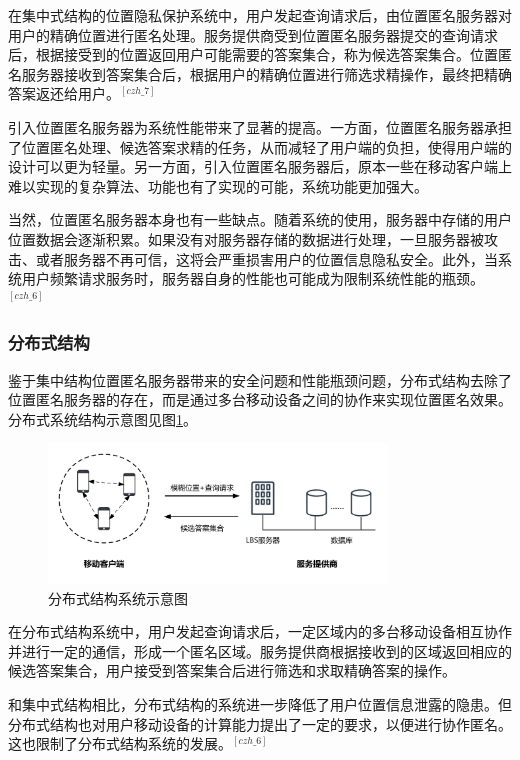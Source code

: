 \documentclass[zihao=-4]{ctexart}
\begin{document}
在集中式结构的位置隐私保护系统中，用户发起查询请求后，由位置匿名服务器对用户的精确位置进行匿名处理。服务提供商受到位置匿名服务器提交的查询请求后，根据接受到的位置返回用户可能需要的答案集合，称为候选答案集合。位置匿名服务器接收到答案集合后，根据用户的精确位置进行筛选求精操作，最终把精确答案返还给用户。$^{[czh\_7]}$
\par
引入位置匿名服务器为系统性能带来了显著的提高。一方面，位置匿名服务器承担了位置匿名处理、候选答案求精的任务，从而减轻了用户端的负担，使得用户端的设计可以更为轻量。另一方面，引入位置匿名服务器后，原本一些在移动客户端上难以实现的复杂算法、功能也有了实现的可能，系统功能更加强大。
\par
当然，位置匿名服务器本身也有一些缺点。随着系统的使用，服务器中存储的用户位置数据会逐渐积累。如果没有对服务器存储的数据进行处理，一旦服务器被攻击、或者服务器不再可信，这将会严重损害用户的位置信息隐私安全。此外，当系统用户频繁请求服务时，服务器自身的性能也可能成为限制系统性能的瓶颈。$^{[czh\_6]}$


\subsubsection{分布式结构}
鉴于集中结构位置匿名服务器带来的安全问题和性能瓶颈问题，分布式结构去除了位置匿名服务器的存在，而是通过多台移动设备之间的协作来实现位置匿名效果。分布式系统结构示意图见图\ref{分布式结构}。
\begin{figure}[H] %
	\centering %
	\includegraphics[width=0.8\textwidth]{./include_picture/分布式点对点结构（绪论-研究现状）} %
	\caption{分布式结构系统示意图} %
	\label{分布式结构} %
\end{figure}

在分布式结构系统中，用户发起查询请求后，一定区域内的多台移动设备相互协作并进行一定的通信，形成一个匿名区域。服务提供商根据接收到的区域返回相应的候选答案集合，用户接受到答案集合后进行筛选和求取精确答案的操作。
\par
和集中式结构相比，分布式结构的系统进一步降低了用户位置信息泄露的隐患。但分布式结构也对用户移动设备的计算能力提出了一定的要求，以便进行协作匿名。这也限制了分布式结构系统的发展。$^{[czh\_6]}$
\end{document}
